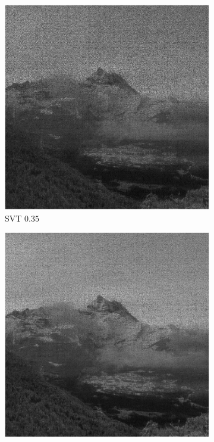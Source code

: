\begin{figure}[!ht]
    \centering
    \begin{subfigure}{0.325\linewidth}
        \includegraphics[width=\linewidth]{Poglavja/Slike/grayscale1000/slikaRez35SVT.png}
        \caption{SVT $0.35$}
    \end{subfigure}
    \hfill
    \begin{subfigure}{0.325\linewidth}
        \includegraphics[width=\linewidth]{Poglavja/Slike/grayscale1000/slikaRez45SVT.png}

\end{subfigure}
\end{figure}
